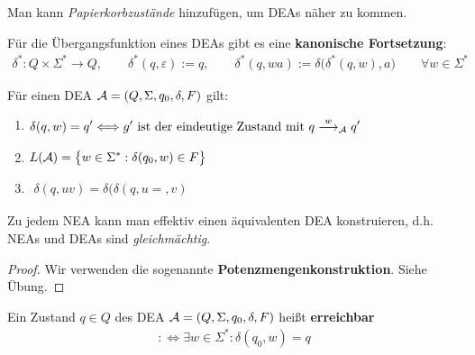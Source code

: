 Man kann \textit{Papierkorbzustände} hinzufügen, um DEAs näher zu kommen. %

\begin{definition}\label{def2.3}
	Für die Übergangsfunktion eines DEAs gibt es eine \textbf{kanonische Fortsetzung}:
	\begin{align*}
		\delta^\ast:Q\times\Sigma^\ast\to Q,\qquad
		\delta^\ast(q,\varepsilon):=q,\qquad
		\delta^\ast(q,wa):=\delta\big(\delta^\ast(q,w),a\big)\qquad\forall w\in\Sigma^\ast
	\end{align*}
\end{definition}

\begin{bemerkung}
	Für einen DEA $\mathcal{A}=(Q,\Sigma,q_0,\delta,F)$ gilt:
	\begin{enumerate}
		\item $\begin{aligned}
			\delta(q,w)=q'\Longleftrightarrow g'\text{ ist der eindeutige Zustand mit }q\overset{w}{\longrightarrow}_{\mathcal{A}} q'
		\end{aligned}$
		\item $\begin{aligned}
			L(\mathcal{A})=\big\lbrace w\in\Sigma^\ast:\delta(q_0,w)\in F\big\rbrace
		\end{aligned}$
		\item $\begin{aligned}
			\delta(q,uv)=\delta\big(\delta(q,u=,v)
		\end{aligned}$
	\end{enumerate}
\end{bemerkung}

\begin{satz}\label{satz2.4}
	Zu jedem NEA kann man effektiv einen äquivalenten DEA konstruieren, d.h. NEAs und DEAs sind \textit{gleichmächtig}.
\end{satz}

\begin{proof}
	Wir verwenden die sogenannte \textbf{Potenzmengenkonstruktion}. Siehe Übung.
\end{proof}

\begin{definition}
	Ein Zustand $q\in Q$ des DEA $\mathcal{A}=(Q,\Sigma,q_0,\delta,F)$ heißt \textbf{erreichbar}
	\begin{align*}
		:\Longleftrightarrow\exists w\in\Sigma^\ast:\delta(q_0,w)=q
	\end{align*}
\end{definition}

